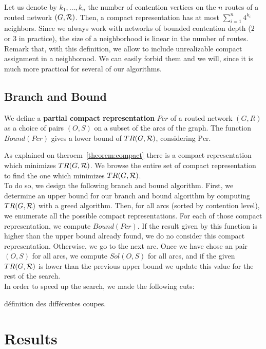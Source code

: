 \documentclass[english]{article}
\begin{document}
 Let us denote by $k_1,\ldots,k_n$ the number of contention vertices on the $n$ routes of 
 a routed network $(G,\cal{R})$. Then, a compact representation has at most $\sum_{i=1}^n 4^{k_i}$ neighbors. Since we always work with networks of bounded contention depth ($2$ or $3$ in practice), the size of a neighborhood is linear in the number of routes.
 Remark that, with this definition, we allow to include unrealizable compact assignment in a neighborood. We can easily forbid them and we will, since it is much more practical for several of our algorithms. 
 
\subsection{Branch and Bound}
We define a \textbf{partial compact representation} $Pcr$ of a routed network $(G,R)$ as a choice of pairs $(O,S)$ on a subset of the arcs of the graph.
The function $Bound(Pcr)$ gives a lower bound of $TR(G,{\cal R})$, considering Pcr.


 As explained on theroem~\ref{theorem:compact} there is a compact representation which minimizes $TR(G,{\cal R})$. We browse the entire set of compact representation to find the one which minimizes $TR(G,{\cal R})$.\\
 To do so, we design the following branch and bound algorithm. First, we determine an upper bound for our branch and bound algorithm by computing $TR(G,{\cal R})$ with a greed algorithm. Then, for all arcs (sorted by contention level), we enumerate all the possible compact representations. For each of those compact representation, we compute $Bound(Pcr)$. If the result given by this function is higher than the upper bound already found, we do no consider this compact representation. Otherwise, we go to the next arc. Once we have chose an pair $(O,S)$ for all arcs, we compute $Sol(O,S)$ for all arcs, and if the given $TR(G,{\cal R})$ is lower than the previous upper bound we update this value for the rest of the search.\\


In order to speed up the search, we made the following cuts:

définition des différentes coupes.\\

\section{Results}
\end{document}
